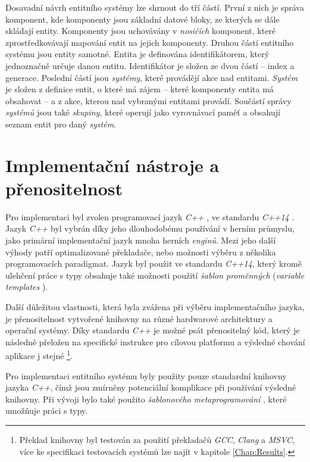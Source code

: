 Dosavadní návrh entitního systémy lze shrnout do tří částí. První z nich je správa komponent, kde komponenty jsou základní datové bloky, ze kterých se dále skládají entity. Komponenty jsou uchovávány v \emph{nosičích} komponent, které zprostředkovávají mapování entit na jejich komponenty. Druhou částí entitního systému jsou entity samotné. Entita je definována identifikátorem, který jednoznačně určuje danou entitu. Identifikátor je složen ze dvou částí -- index a generace. Poslední částí jsou \emph{systémy}, které provádějí akce nad entitami. \emph{Systém} je složen z definice entit, o které má zájem -- které komponenty entita má obsahovat -- a z akce, kterou nad vybranými entitami provádí. Součástí správy \emph{systémů} jsou také \emph{skupiny}, které operují jako vyrovnávací paměť a obsahují seznam entit pro daný \emph{systém}. 

\section{Implementační nástroje a přenositelnost}

Pro implementaci byl zvolen programovací jazyk \emph{C++} \cite{IsoCpp}, ve standardu \emph{C++14} \cite{Cpp14}. Jazyk \emph{C++} byl vybrán díky jeho dlouhodobému používání v herním průmyslu, jako primární implementační jazyk mnoha herních \emph{enginů}. Mezi jeho další výhody patří optimalizované překladače, nebo možnosti výběru z několika programovacích paradigmat. Jazyk byl použit ve standardu \emph{C++14}, který kromě ulehčení práce s typy obsahuje také možnosti použití \emph{šablon proměnných} (\emph{variable templates} \cite{Cpp14VarTemplate}). 

Další důležitou vlastnosti, která byla zvážena při výběru implementačního jazyka, je přenositelnost vytvořené knihovny na různé hardwarové architektury a operační systémy. Díky standardu \emph{C++} je možné psát přenositelný kód, který je následně přeložen na specifické instrukce pro cílovou platformu a výsledné chování aplikace j stejné \footnote{Překlad knihovny byl testován za použití překladačů \emph{GCC}, \emph{Clang} a \emph{MSVC}, více ke specifikaci testovacích systémů lze najít v kapitole \ref{Chap:Results}.}. 

Pro implementaci entitního systému byly použity pouze standardní knihovny jazyka \emph{C++}, čímž jsou zmírněny potenciální komplikace při používání výsledné knihovny. Při vývoji bylo také použito \emph{šablonového metaprogramování} \cite{CppMetaprogramming}, které umožňuje práci s typy.

